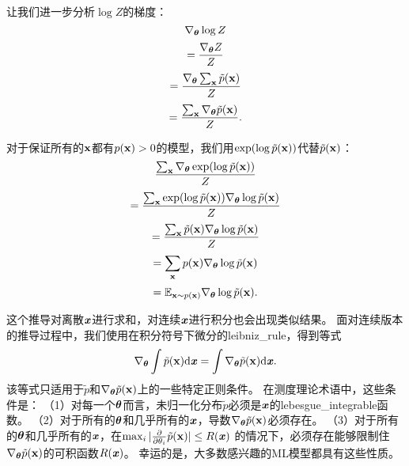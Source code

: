 让我们进一步分析$\log Z$的梯度：
\begin{equation}
	\nabla_{\boldsymbol{\theta}} \log Z
\end{equation}
\begin{equation}
	= \frac{ \nabla_{\boldsymbol{\theta}} Z }{Z}
\end{equation}
\begin{equation}
	= \frac{ \nabla_{\boldsymbol{\theta}} \sum_{\mathbf{x}} \tilde{p}(\mathbf{x}) }{Z}
\end{equation}
\begin{equation}
	= \frac{ \sum_{\mathbf{x}} \nabla_{\boldsymbol{\theta}} \tilde{p}(\mathbf{x}) }{Z}.
\end{equation}


对于保证所有的$\mathbf{x}$都有$p(\mathbf{x}) > 0$的模型，我们用$\exp(\log \tilde{p}(\mathbf{x}))$代替$\tilde{p}(\mathbf{x})$：
\begin{equation}
	\frac{ \sum_{\mathbf{x}} \nabla_{\boldsymbol{\theta}} \exp (\log \tilde{p} (\mathbf{x})) }{ Z }
\end{equation}
\begin{equation}
	= \frac{  \sum_{\mathbf{x}}  \exp (\log \tilde{p} (\mathbf{x})) \nabla_{\boldsymbol{\theta}} \log \tilde{p}(\mathbf{x})  }{Z}
\end{equation}
\begin{equation}
	=\frac{  \sum_{\mathbf{x}} \tilde{p} (\mathbf{x})  \nabla_{\boldsymbol{\theta}} \log \tilde{p}(\mathbf{x})  }{ Z}
\end{equation}
\begin{equation}
	=\sum_{\mathbf{x}} p(\mathbf{x}) \nabla_{\boldsymbol{\theta}} \log \tilde{p} ( \mathbf{x} )
 \end{equation}
\begin{equation}
	=\mathbb{E}_{\mathbf{x} \sim p(\mathbf{x})} \nabla_{\boldsymbol{\theta}} \log \tilde{p} (\mathbf{x}).
\end{equation}


这个推导对离散$\boldsymbol{\mathit{x}}$进行求和，对连续$\boldsymbol{\mathit{x}}$进行积分也会出现类似结果。
面对连续版本的推导过程中，我们使用在积分符号下微分的\gls{leibniz_rule}，得到等式
\begin{equation}
	\nabla_{\boldsymbol{\theta}} \int \tilde{p} (\mathbf{x}) \mathrm{d} \boldsymbol{\mathit{x}}  = \int \nabla_{\boldsymbol{\theta}} 
\tilde{p} (\mathbf{x}) \mathrm{d} \boldsymbol{\mathit{x}}.
\end{equation}
该等式只适用于$\tilde{p}$和$\nabla_{\boldsymbol{\theta}} \tilde{p} (\mathbf{x})$上的一些特定正则条件。
在测度理论术语中，这些条件是：
（1）对每一个$\boldsymbol{\theta}$而言，未归一化分布$\tilde{p}$必须是$\boldsymbol{\mathit{x}}$的\gls{lebesgue_integrable}函数。
（2）对于所有的$\boldsymbol{\theta}$和几乎所有的$\boldsymbol{\mathit{x}}$，导数$\nabla_{\boldsymbol{\theta}} \tilde{p}(\mathbf{x})$必须存在。
（3）对于所有的$\boldsymbol{\theta}$和几乎所有的$\boldsymbol{\mathit{x}}$，在$\max_i | \frac{\partial}{\partial \theta_i } \tilde{p} (\mathbf{x}) | \leq R(\boldsymbol{\mathit{x}})$ 的情况下，必须存在能够限制住$\nabla_{\boldsymbol{\theta}} \tilde{p}(\mathbf{x})$的可积函数$R(\boldsymbol{\mathit{x}})$。
幸运的是，大多数感兴趣的\gls{ML}模型都具有这些性质。


